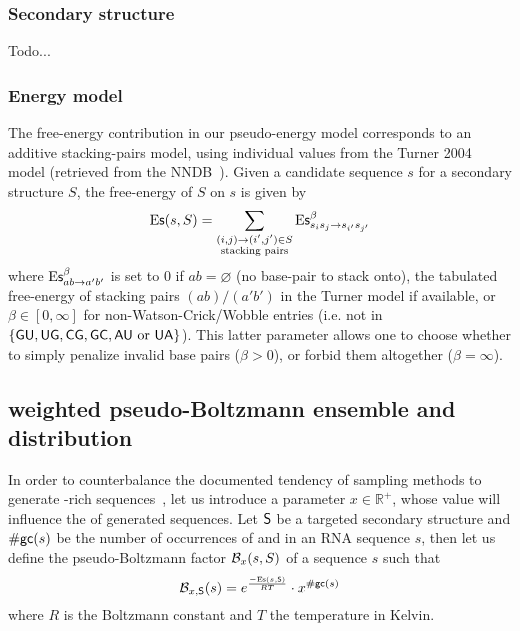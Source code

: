 
\subsubsection{Secondary structure}
Todo...

\subsubsection{Energy model}
The free-energy contribution in our pseudo-energy model corresponds to an additive stacking-pairs model, using individual values from the Turner 2004 model (retrieved from the NNDB~\cite{Turner2010}). Given a candidate sequence $s$ for a secondary structure $S$, the free-energy of $S$ on $s$ is given by
\begin{align*}
  \text{E{\sf s}}(s,S) = \sum_{\substack{(i,j)\to (i',j')\in S\\ \text{stacking pairs}}}\text{E{\sf s}}^{\beta}_{s_is_j\to s_{i'}s_{j'}} 
\end{align*}
where $\text{E{\sf s}}^{\beta}_{ab\to a'b'}$ is set to $0$ if $ab=\varnothing$ (no base-pair to stack onto), the tabulated free-energy of stacking pairs $(ab)/(a'b')$ in the Turner model if available, or $\beta\in[0,\infty]$ for non-Watson-Crick/Wobble entries (i.e. not in $\{{\sf{G}}{\sf{U}},{\sf{U}}{\sf{G}},{\sf{C}}{\sf{G}},{\sf{G}}{\sf{C}}, {\sf{A}}{\sf{U}}\text{ or }{\sf{U}}{\sf{A}}\}$). This latter parameter allows one to choose whether to simply penalize invalid base pairs ($\beta>0$), or forbid them altogether ($\beta = \infty$).

\subsection{\GCContent weighted pseudo-Boltzmann ensemble and distribution}

In order to counterbalance the documented tendency of sampling methods to generate \Gb\Cb-rich sequences~\cite{Levin:2012kx}, let us introduce a parameter $x\in\mathbb{R}^+$, whose value will influence the \GCContent of generated sequences. Let $\text{\sf S}$ be a targeted secondary structure and ${\#\text{{\sf gc}}}(s)$ be the number of occurrences of \Gb and \Cb in an RNA sequence $s$, then let us define the pseudo-Boltzmann factor $\mathcal{B}_{x}(s,S)$ of a sequence $s$ such that
\begin{equation}
\mathcal{B}_{x, \text{\sf S}}(s) = e^{\frac{-\text{E{\sf s}}(s,\text{\sf S})}{RT}}\cdot x^{{\#\text{{\sf gc}}}(s)}
\label{def:genBoltz}
\end{equation}
where $R$ is the Boltzmann constant and $T$ the temperature in Kelvin.

